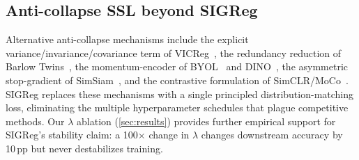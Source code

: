 \subsection{Anti-collapse SSL beyond SIGReg}

Alternative anti-collapse mechanisms include the explicit
variance/invariance/covariance term of VICReg~\cite{vicreg2022}, the
redundancy reduction of Barlow Twins~\cite{barlowtwins2021}, the
momentum-encoder of BYOL~\cite{byol2020} and DINO~\cite{dino2021}, the
asymmetric stop-gradient of SimSiam~\cite{simsiam2021}, and the contrastive
formulation of SimCLR/MoCo~\cite{simclr2020,moco2020}. SIGReg replaces these
mechanisms with a single principled distribution-matching loss, eliminating
the multiple hyperparameter schedules that plague competitive methods. Our
$\lambda$ ablation (\cref{sec:results}) provides further empirical
support for SIGReg's stability claim: a 100$\times$ change in $\lambda$
changes downstream accuracy by 10\,pp but never destabilizes training.
